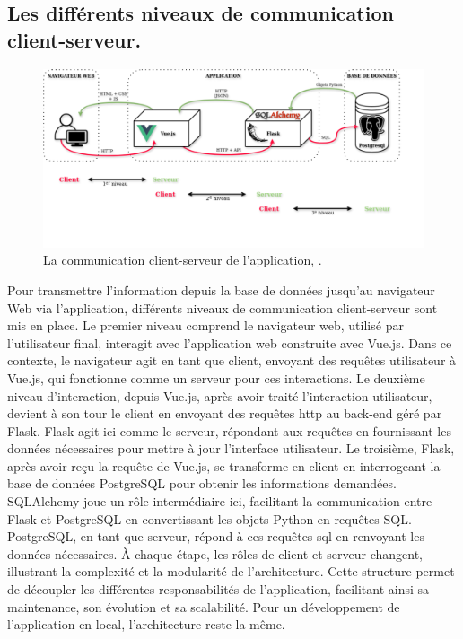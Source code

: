\subsection{Les différents niveaux de communication client-serveur.}
\begin{figure}
    \includegraphics[width=1\linewidth]{images/Niveaux_communication_application.png}
    \caption{La communication client-serveur de l'application, \mhd.}
    \label{fig:enter-label}
\end{figure}
Pour transmettre l'information depuis la base de données jusqu'au navigateur Web via l'application, différents niveaux de communication client-serveur sont mis en place. Le premier niveau comprend le navigateur web, utilisé par l'utilisateur final, interagit avec l'application web construite avec Vue.js. Dans ce contexte, le navigateur agit en tant que client, envoyant des requêtes utilisateur à Vue.js, qui fonctionne comme un serveur pour ces interactions. Le deuxième niveau d'interaction, depuis Vue.js, après avoir traité l'interaction utilisateur, devient à son tour le client en envoyant des requêtes \acrshort{http} au back-end géré par Flask. Flask agit ici comme le serveur, répondant aux requêtes en fournissant les données nécessaires pour mettre à jour l'interface utilisateur. Le troisième, Flask, après avoir reçu la requête de Vue.js, se transforme en client en interrogeant la base de données PostgreSQL pour obtenir les informations demandées. SQLAlchemy joue un rôle intermédiaire ici, facilitant la communication entre Flask et PostgreSQL en convertissant les objets Python en requêtes SQL. PostgreSQL, en tant que serveur, répond à ces requêtes \acrshort{sql} en renvoyant les données nécessaires. À chaque étape, les rôles de client et serveur changent, illustrant la complexité et la modularité de l'architecture. Cette structure permet de découpler les différentes responsabilités de l'application, facilitant ainsi sa maintenance, son évolution et sa scalabilité. 
Pour un développement de l'application en local, l'architecture reste la même. 

